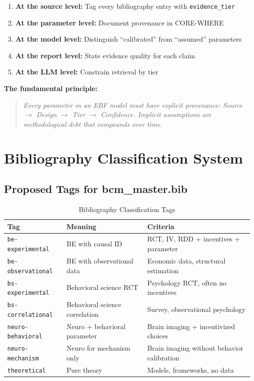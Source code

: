 \documentclass[11pt, a4paper]{article}
\begin{document}
\begin{enumerate}
\item \textbf{At the source level:} Tag every bibliography entry with \texttt{evidence\_tier}
\item \textbf{At the parameter level:} Document provenance in CORE-WHERE
\item \textbf{At the model level:} Distinguish ``calibrated'' from ``assumed'' parameters
\item \textbf{At the report level:} State evidence quality for each claim
\item \textbf{At the LLM level:} Constrain retrieval by tier
\end{enumerate}

\textbf{The fundamental principle:}
\begin{quote}
\textit{Every parameter in an EBF model must have explicit provenance: Source $\to$ Design $\to$ Tier $\to$ Confidence. Implicit assumptions are methodological debt that compounds over time.}
\end{quote}


\section{Bibliography Classification System}
\label{sec:evd-bibliography}

\subsection{Proposed Tags for bcm\_master.bib}

\begin{table}[htbp]
\centering
\caption{Bibliography Classification Tags}
\label{tab:evd-tags}
\renewcommand{\arraystretch}{1.3}
\begin{tabular}{@{}llp{6cm}@{}}
\toprule
\textbf{Tag} & \textbf{Meaning} & \textbf{Criteria} \\
\midrule
\texttt{be-experimental} & BE with causal ID & RCT, IV, RDD + incentives + parameter \\
\texttt{be-observational} & BE with observational data & Economic data, structural estimation \\
\texttt{bs-experimental} & Behavioral science RCT & Psychology RCT, often no incentives \\
\texttt{bs-correlational} & Behavioral science correlation & Survey, observational psychology \\
\texttt{neuro-behavioral} & Neuro + behavioral parameter & Brain imaging + incentivized choices \\
\texttt{neuro-mechanism} & Neuro for mechanism only & Brain imaging without behavior calibration \\
\texttt{theoretical} & Pure theory & Models, frameworks, no data \\
\bottomrule
\end{tabular}
\end{table}
\end{document}
